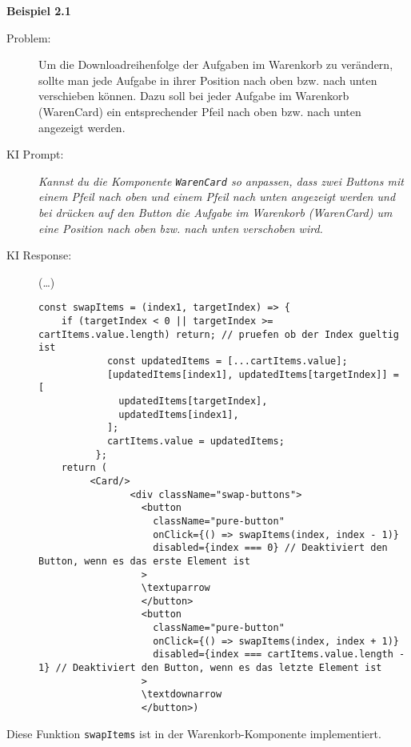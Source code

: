 \textbf{Beispiel 2.1} 
\begin{description}
    \item[Problem:] 
Um die Downloadreihenfolge der Aufgaben im Warenkorb zu verändern, sollte man jede Aufgabe in ihrer Position nach oben bzw. nach unten verschieben können. Dazu soll bei jeder Aufgabe im Warenkorb (WarenCard) ein entsprechender Pfeil nach oben bzw. nach unten angezeigt werden. 
    \item[KI Prompt:] \emph{ Kannst du die Komponente \texttt{WarenCard} so anpassen, dass zwei Buttons mit einem Pfeil nach oben und einem Pfeil nach unten angezeigt werden und bei drücken auf den Button die Aufgabe im Warenkorb (WarenCard) um eine Position nach oben bzw. nach unten verschoben wird. }
    \item[KI Response:] (\ldots)
\begin{lstlisting}
const swapItems = (index1, targetIndex) => {
    if (targetIndex < 0 || targetIndex >= cartItems.value.length) return; // pruefen ob der Index gueltig ist
            const updatedItems = [...cartItems.value];
            [updatedItems[index1], updatedItems[targetIndex]] = [
              updatedItems[targetIndex],
              updatedItems[index1],
            ];
            cartItems.value = updatedItems;
          };
    return (
         <Card/>
                <div className="swap-buttons">
                  <button
                    className="pure-button"
                    onClick={() => swapItems(index, index - 1)}
                    disabled={index === 0} // Deaktiviert den Button, wenn es das erste Element ist
                  >
                  \textuparrow
                  </button>
                  <button
                    className="pure-button"
                    onClick={() => swapItems(index, index + 1)}
                    disabled={index === cartItems.value.length - 1} // Deaktiviert den Button, wenn es das letzte Element ist
                  >
                  \textdownarrow
                  </button>)
    \end{lstlisting}
\end{description}

Diese Funktion \texttt{swapItems} ist in der Warenkorb-Komponente implementiert. 



